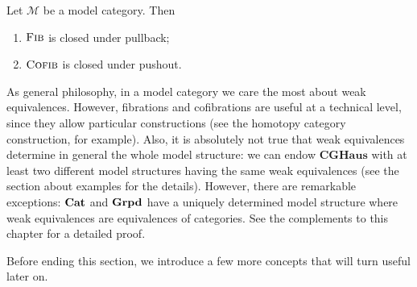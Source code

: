 \begin{refsection}
\begin{cor} \label{cor stability for base and cobase change}
Let $\mathcal M$ be a model category. Then
\begin{enumerate}
\item $\textsc{Fib}$ is closed under pullback;
\item $\textsc{Cofib}$ is closed under pushout.
\end{enumerate}
\end{cor}

\begin{rmk}
As general philosophy, in a model category we care the most about weak equivalences. However, fibrations and cofibrations are useful at a technical level, since they allow particular constructions (see the homotopy category construction, for example). Also, it is absolutely not true that weak equivalences determine in general the whole model structure: we can endow $\mathbf{CGHaus}$ with at least two different model structures having the same weak equivalences (see the section about examples for the details). However, there are remarkable exceptions: $\mathbf{Cat}$ and $\mathbf{Grpd}$ have a uniquely determined model structure where weak equivalences are equivalences of categories. See the complements to this chapter for a detailed proof.
\end{rmk}

Before ending this section, we introduce a few more concepts that will turn useful later on.


\end{refsection}
